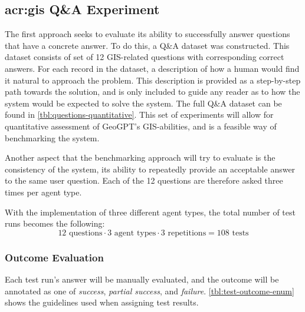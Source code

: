 \subsection[GIS Q\&A Experiment]{\acrshort{acr:gis} Q\&A Experiment}
\label{subsec:benchmarking-setup}

The first approach seeks to evaluate its ability to successfully answer questions that have a concrete answer. To do this, a Q\&A dataset was constructed. This dataset consists of set of 12 GIS-related questions with corresponding correct answers. For each record in the dataset, a description of how a human would find it natural to approach the problem. This description is provided as a step-by-step path towards the solution, and is only included to guide any reader as to how the system would be expected to solve the system. The full Q\&A dataset can be found in \autoref{tbl:questions-quantitative}. This set of experiments will allow for quantitative assessment of GeoGPT's GIS-abilities, and is a feasible way of benchmarking the system.

Another aspect that the benchmarking approach will try to evaluate is the consistency of the system, its ability to repeatedly provide an acceptable answer to the same user question. Each of the 12 questions are therefore asked three times per agent type.

With the implementation of three different agent types, the total number of test runs becomes the following: $$12 \text{ questions} \cdot 3 \text{ agent types} \cdot 3 \text{ repetitions} = 108 \text{ tests}$$


\subsubsection{Outcome Evaluation}

Each test run's answer will be manually evaluated, and the outcome will be annotated as one of \textit{success}, \textit{partial success}, and \textit{failure}. \autoref{tbl:test-outcome-enum} shows the guidelines used when assigning test results.

